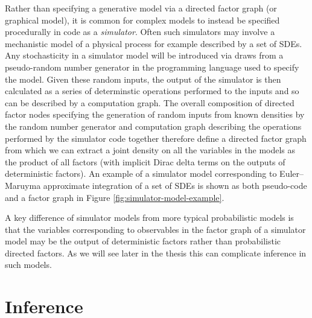 Rather than specifying a generative model via a directed factor graph (or graphical model), it is common for complex models to instead be specified procedurally in code as a \emph{simulator}. Often such simulators may involve a mechanistic model of a physical process for example described by a set of \acfp{SDE}. Any stochasticity in a simulator model will be introduced via draws from a pseudo-random number generator in the programming language used to specify the model. Given these random inputs, the output of the simulator is then calculated as a series of determinstic operations performed to the inputs and so can be described by a computation graph. The overall composition of directed factor nodes specifying the generation of random inputs from known densities by the random number generator and computation graph describing the operations performed by the simulator code together therefore define a directed factor graph from which we can extract a joint density on all the variables in the models as the product of all factors (with implicit Dirac delta terms on the outputs of deterministic factors).  An example of a simulator model corresponding to Euler--Maruyma approximate integration \citep{kloeden1992numerical} of a set of \acp{SDE} is shown as both pseudo-code and a factor graph in Figure \ref{fig:simulator-model-example}.

A key difference of simulator models from more typical probabilistic models is that the variables corresponding to observables in the factor graph of a simulator model may be the output of deterministic factors rather than probabilistic directed factors. As we will see later in the thesis this can complicate inference in such models. 


\section{Inference}

